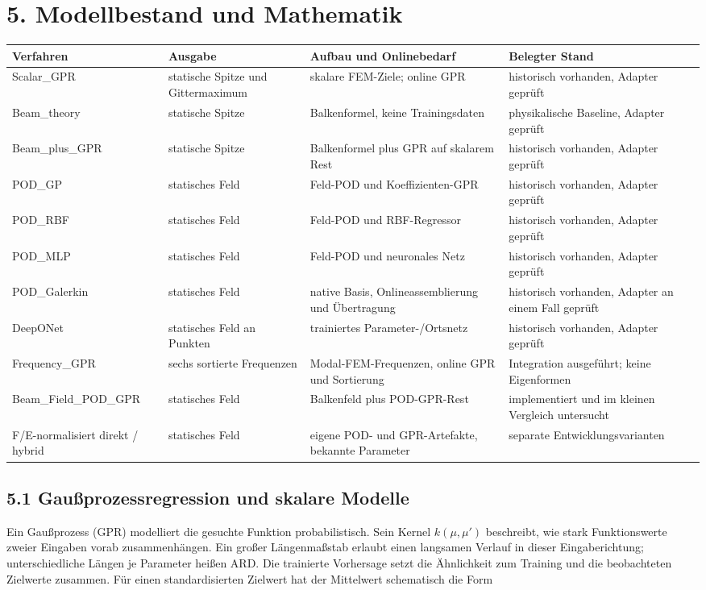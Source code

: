 \documentclass[11pt,a4paper]{article}
\begin{document}
\section{5. Modellbestand und Mathematik}
\begingroup\small\begin{longtable}{>{\raggedright\arraybackslash}p{}>{\raggedright\arraybackslash}p{}>{\raggedright\arraybackslash}p{}>{\raggedright\arraybackslash}p{}}
\toprule
Verfahren & Ausgabe & Aufbau und Onlinebedarf & Belegter Stand\\ \midrule\endhead
Scalar\_\allowbreak{}GPR & statische Spitze und Gittermaximum & skalare FEM-Ziele; online GPR & historisch vorhanden, Adapter geprüft\\
Beam\_\allowbreak{}theory & statische Spitze & Balkenformel, keine Trainingsdaten & physikalische Baseline, Adapter geprüft\\
Beam\_\allowbreak{}plus\_\allowbreak{}GPR & statische Spitze & Balkenformel plus GPR auf skalarem Rest & historisch vorhanden, Adapter geprüft\\
POD\_\allowbreak{}GP & statisches Feld & Feld-POD und Koeffizienten-GPR & historisch vorhanden, Adapter geprüft\\
POD\_\allowbreak{}RBF & statisches Feld & Feld-POD und RBF-Regressor & historisch vorhanden, Adapter geprüft\\
POD\_\allowbreak{}MLP & statisches Feld & Feld-POD und neuronales Netz & historisch vorhanden, Adapter geprüft\\
POD\_\allowbreak{}Galerkin & statisches Feld & native Basis, Onlineassemblierung und Übertragung & historisch vorhanden, Adapter an einem Fall geprüft\\
DeepONet & statisches Feld an Punkten & trainiertes Parameter-/Ortsnetz & historisch vorhanden, Adapter geprüft\\
Frequency\_\allowbreak{}GPR & sechs sortierte Frequenzen & Modal-FEM-Frequenzen, online GPR und Sortierung & Integration ausgeführt; keine Eigenformen\\
Beam\_\allowbreak{}Field\_\allowbreak{}POD\_\allowbreak{}GPR & statisches Feld & Balkenfeld plus POD-GPR-Rest & implementiert und im kleinen Vergleich untersucht\\
F/E-normalisiert direkt / hybrid & statisches Feld & eigene POD- und GPR-Artefakte, bekannte Parameter & separate Entwicklungsvarianten\\
\bottomrule\end{longtable}\endgroup
\subsection{5.1 Gaußprozessregression und skalare Modelle}
Ein Gaußprozess (GPR) modelliert die gesuchte Funktion probabilistisch. Sein Kernel $k(\mu,\mu')$ beschreibt, wie stark Funktionswerte zweier Eingaben vorab zusammenhängen. Ein großer Längenmaßstab erlaubt einen langsamen Verlauf in dieser Eingaberichtung; unterschiedliche Längen je Parameter heißen ARD. Die trainierte Vorhersage setzt die Ähnlichkeit zum Training und die beobachteten Zielwerte zusammen. Für einen standardisierten Zielwert hat der Mittelwert schematisch die Form
\end{document}

